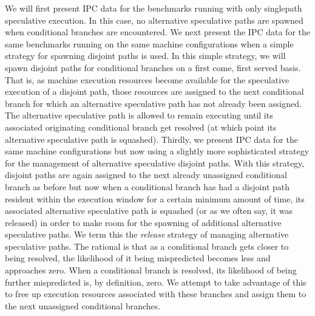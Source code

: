 \documentclass[10pt,dvips]{article}
\begin{document}
We will first present IPC data for the benchmarks running
with only singlepath speculative execution.  In this case, no
alternative speculative paths are spawned when conditional
branches are encountered.
We next present the IPC data for the same benchmarks running
on the same machine configurations when a simple
strategy for spawning disjoint paths is used.
In this simple strategy, we will spawn disjoint paths for conditional
branches on a first come, first served basis.  That is, as machine
execution resources become available for the speculative execution
of a disjoint path, those resources are assigned to the next conditional
branch for which an alternative speculative path has not already 
been assigned.  The alternative speculative path is allowed to
remain executing until its associated originating conditional
branch get resolved (at which point its alternative speculative
path is squashed).
Thirdly, we present IPC data for the same machine configurations
but now using a slightly more sophisticated strategy for the management
of alternative speculative disjoint paths.
With this strategy, 
disjoint paths are again assigned to the next already unassigned
conditional branch as before but now when a conditional branch
has had a disjoint path resident within the execution window for a certain
minimum amount of time,
its associated alternative speculative path
is squashed (or as we often say, it was released) in order to make room for
the spawning of additional alternative speculative paths.
We term this the \textit{release} strategy of managing
alternative speculative paths.
The rational is that as a conditional branch gets closer to
being resolved, the likelihood of it being mispredicted becomes
less and approaches zero.  When a conditional branch is resolved,
its likelihood of being further mispredicted is, by definition,
zero.  We attempt to take advantage of this to free up execution
resources associated with these branches and assign them to the
next unassigned conditional branches.
\end{document}
